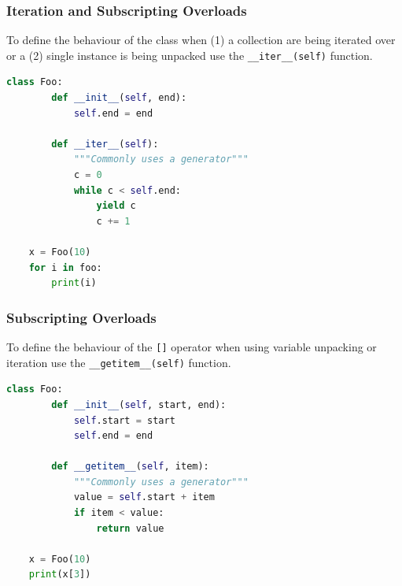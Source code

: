 \documentclass{beamer}
\begin{document}
%
%
\begin{frame}[fragile]
    \frametitle{Iteration and Subscripting Overloads }
    To define the behaviour of the class when (1) a collection are being iterated over or a (2) single instance is being unpacked use the \lstinline|__iter__(self)| function.
    \begin{lstlisting}[language=Python, autogobble]
    class Foo:
        def __init__(self, end):
            self.end = end

        def __iter__(self):
            """Commonly uses a generator"""
            c = 0
            while c < self.end:
                yield c
                c += 1

    x = Foo(10)
    for i in foo:
        print(i)
    \end{lstlisting}
\end{frame}


%
%
\begin{frame}[fragile]
    \frametitle{Subscripting Overloads}
    To define the behaviour of the \lstinline|[]| operator when using variable unpacking or iteration use the \lstinline|__getitem__(self)| function.

    \begin{lstlisting}[language=Python, autogobble]
    class Foo:
        def __init__(self, start, end):
            self.start = start
            self.end = end

        def __getitem__(self, item):
            """Commonly uses a generator"""
            value = self.start + item 
            if item < value:
                return value

    x = Foo(10)
    print(x[3])
    \end{lstlisting}
\end{frame}
\end{document}
